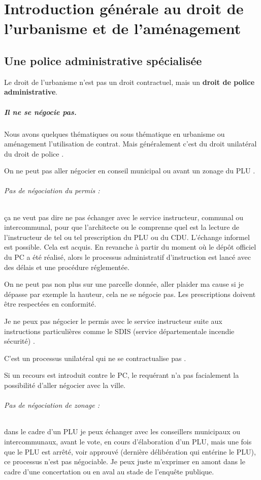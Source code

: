 \chapter[Introduction]{Introduction générale au droit de l'urbanisme et de l'aménagement}

	\section{Une police administrative spécialisée}

		Le droit de l’urbanisme n’est pas un droit contractuel, mais un \textbf{droit de police administrative}.


		\paragraph{Il ne se négocie pas.}
		Nous avons quelques thématiques ou sous thématique en urbanisme ou aménagement l’utilisation de contrat. Mais généralement c’est du droit unilatéral \CAD du droit de police
.

		On ne peut pas aller négocier en conseil municipal ou avant un zonage du PLU
.

		\subparagraph{Pas de négociation du permis :}
		 ça ne veut pas dire ne pas échanger avec le service instructeur, communal ou intercommunal, pour que l’architecte ou le \MO comprenne quel est la lecture de l’instructeur de tel ou tel prescription du PLU ou du CDU. L’échange informel est possible. Cela est acquis. En revanche à partir du moment où le dépôt officiel du PC a été réalisé, alors le processus administratif d’instruction est lancé avec des délais et une procédure réglementée.


		On ne peut pas non plus sur une parcelle donnée, aller plaider ma cause si je dépasse par exemple la hauteur, cela ne se négocie pas. Les prescriptions doivent être respectées en conformité.

		Je ne peux pas négocier le permis avec le service instructeur suite aux instructions particulières comme le SDIS (service départementale incendie sécurité)
.

		C’est un processus unilatéral qui ne se contractualise pas
.

		Si un recours est introduit contre le PC, le requérant n’a pas facialement la possibilité d’aller négocier avec la ville.


		\subparagraph{Pas de négociation de zonage :}
		dans le cadre d’un PLU je peux échanger avec les conseillers municipaux ou intercommunaux, avant le vote, en cours d’élaboration d’un PLU, mais une fois que le PLU est arrêté, voir approuvé (dernière délibération qui entérine le PLU), ce processus n’est pas négociable. Je peux juste m’exprimer en amont dans le cadre d’une concertation ou en aval au stade de l’enquête publique.


